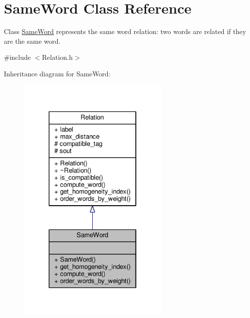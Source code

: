 \hypertarget{classSameWord}{}\section{Same\+Word Class Reference}
\label{classSameWord}


Class \hyperlink{classSameWord}{Same\+Word} represents the same word relation\+: two words are related if they are the same word.  




{\ttfamily \#include $<$Relation.\+h$>$}



Inheritance diagram for Same\+Word\+:
\nopagebreak
\begin{figure}[H]
\begin{center}
\leavevmode
\includegraphics[width=214pt]{classSameWord__inherit__graph}
\end{center}
\end{figure}


